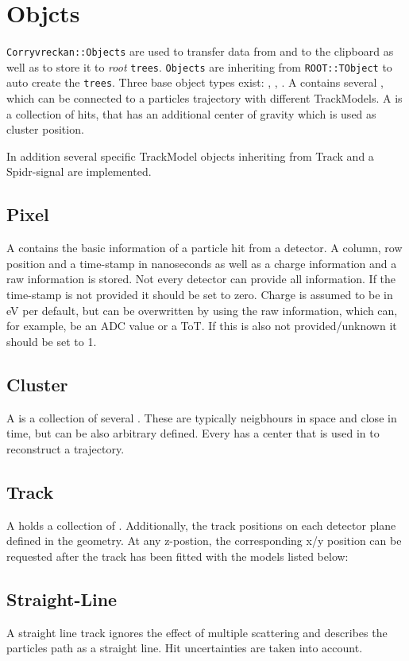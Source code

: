 \section{Objcts}
\label{sec:objects}
\texttt{Corryvreckan::Objects} are used to transfer data from and to the clipboard as well as to store it to \textit{root} \texttt{trees}. 
\texttt{Objects} are inheriting from \texttt{ROOT::TObject} to auto create the \texttt{trees}. 
Three base object types exist: \pixel, \cluster, \track.
A \track contains several \cluster, which can be connected to a particles
trajectory with different TrackModels.
A \cluster is a collection of hits, that has an additional center of gravity
which is used as cluster position.

In addition several specific TrackModel objects inheriting from Track and a Spidr-signal are implemented. 

\subsection*{Pixel}
A \pixel contains the basic information of a particle hit from a detector. A column, row position and a time-stamp in nanoseconds as well as a charge information and a raw information is stored. Not every detector can provide all information. If the time-stamp is not provided it should be set to zero. Charge is assumed to be in eV per default, but can be overwritten by using the raw information, which can, for example, be an ADC value or a ToT. If this is also not provided/unknown it should be set to 1. 

\subsection*{Cluster}
A \cluster is a collection of several \pixel. These \pixel are typically
neigbhours in space and close in time, but can be also arbitrary
defined. Every \cluster has a center that is used in \track to reconstruct a trajectory.  

\subsection{Track}
A \track holds a collection of \cluster. Additionally, the track positions on
each detector plane defined in the geometry. At any z-postion, the
corresponding x/y position can be requested after the track has been fitted
with the models listed below:

\subsection*{Straight-Line}
A straight line track ignores the effect of multiple scattering and describes
the particles path as a straight line. Hit uncertainties are taken into account.
